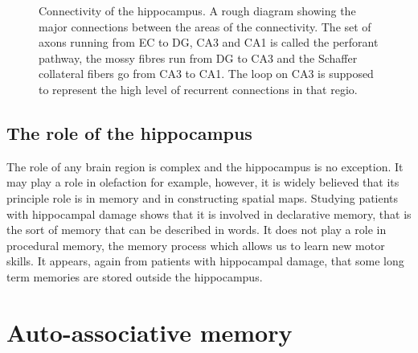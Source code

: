 \documentclass[11pt,a4paper]{scrartcl}
\begin{document}
\begin{figure}
\caption{Connectivity of the hippocampus. A rough diagram showing the
  major connections between the areas of the connectivity. The set of
  axons running from EC to DG, CA3 and CA1 is called the perforant
  pathway, the mossy fibres run from DG to CA3 and the Schaffer
  collateral fibers go from CA3 to CA1. The loop on CA3 is supposed to
  represent the high level of recurrent connections in that
  regio.\label{fig:connectivity}}
\end{figure}


\subsection*{The role of the hippocampus}
The role of any brain region is complex and the hippocampus is no
exception. It may play a role in olefaction for example, however, it
is widely believed that its principle role is in memory and in
constructing spatial maps. Studying patients with hippocampal damage
shows that it is involved in declarative memory, that is the sort of
memory that can be described in words. It does not play a role in
procedural memory, the memory process which allows us to learn new
motor skills. It appears, again from patients with hippocampal damage,
that some long term memories are stored outside the hippocampus.

\section*{Auto-associative memory}
\end{document}
